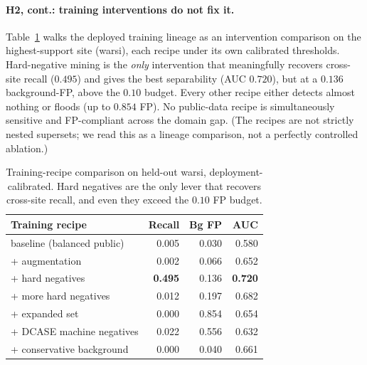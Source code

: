 \paragraph{H2, cont.: training interventions do not fix it.} Table~\ref{tab:diag-ablation}
walks the deployed training lineage as an intervention comparison on the
highest-support site (warsi), each recipe under its own calibrated thresholds.
Hard-negative mining is the \emph{only} intervention that meaningfully recovers
cross-site recall ($0.495$) and gives the best separability (AUC $0.720$), but
at a $0.136$ background-FP, above the $0.10$ budget. Every other recipe either
detects almost nothing or floods (up to $0.854$ FP). No public-data recipe is
simultaneously sensitive and FP-compliant across the domain gap. (The recipes are
not strictly nested supersets; we read this as a lineage comparison, not a
perfectly controlled ablation.)

\begin{table}[t]
\centering
\caption{Training-recipe comparison on held-out warsi, deployment-calibrated.
Hard negatives are the only lever that recovers cross-site recall, and even they
exceed the $0.10$ FP budget.}
\label{tab:diag-ablation}
\small
\begin{tabular}{lrrr}
\toprule
Training recipe & Recall & Bg FP & AUC \\
\midrule
baseline (balanced public) & 0.005 & 0.030 & 0.580 \\
+ augmentation             & 0.002 & 0.066 & 0.652 \\
+ hard negatives           & \textbf{0.495} & 0.136 & \textbf{0.720} \\
+ more hard negatives      & 0.012 & 0.197 & 0.682 \\
+ expanded set             & 0.000 & 0.854 & 0.654 \\
+ DCASE machine negatives  & 0.022 & 0.556 & 0.632 \\
+ conservative background  & 0.000 & 0.040 & 0.661 \\
\bottomrule
\end{tabular}
\end{table}

